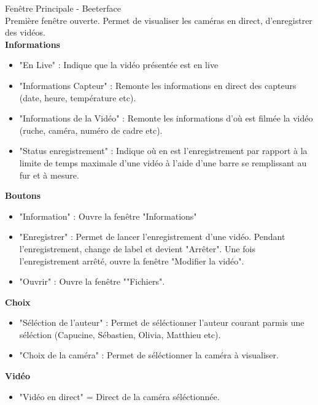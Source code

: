 \documentclass[11pt,french,a4paper]{report}
\begin{document}
\Large Fenêtre Principale - Beeterface \normalsize \\
    Première fenêtre ouverte. Permet de visualiser les caméras en direct, d'enregistrer
    des vidéos. \\
            \large \textbf{Informations} \normalsize
     \begin{itemize}[label=, leftmargin=*,parsep=0cm,itemsep=0cm,topsep=0cm]
        \item "En Live" : Indique que la vidéo présentée est en live
        \item "Informations Capteur" : Remonte les informations en direct des capteurs (date, heure, température etc).
        \item "Informations de la Vidéo" : Remonte les informations d'où est filmée la vidéo (ruche, caméra, numéro de cadre etc).
        \item "Status enregistrement" : Indique où en est l'enregistrement par rapport à la limite de temps maximale d'une vidéo à
               l'aide d'une barre se remplissant au fur et à mesure.
    \end{itemize}
            \large \textbf{Boutons} \normalsize
     \begin{itemize}[label=, leftmargin=*,parsep=0cm,itemsep=0cm,topsep=0cm]
        \item "Information" : Ouvre la fenêtre "Informations"
        \item "Enregistrer" : Permet de lancer l'enregistrement d'une vidéo. Pendant l'enregistrement, change de label et
        devient "Arrêter". Une fois l'enregistrement arrêté, ouvre la fenêtre "Modifier la vidéo".
        \item "Ouvrir" : Ouvre la fenêtre ""Fichiers".
    \end{itemize}
            \large \textbf{Choix} \normalsize
     \begin{itemize}[label=, leftmargin=*,parsep=0cm,itemsep=0cm,topsep=0cm]
        \item "Séléction de l'auteur" : Permet de séléctionner l'auteur courant parmis une séléction (Capucine, Sébastien, Olivia, Matthieu etc).
        \item "Choix de la caméra" : Permet de séléctionner la caméra à visualiser.
    \end{itemize}
            \large \textbf{Vidéo} \normalsize
     \begin{itemize}[label=, leftmargin=*,parsep=0cm,itemsep=0cm,topsep=0cm]
        \item "Vidéo en direct" = Direct de la caméra séléctionnée.
    \end{itemize}
\end{document}
